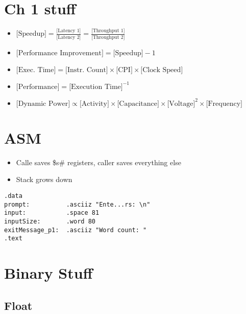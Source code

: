 \documentclass[letterpaper,landscape]{article}
\begin{document}
\begin{multicols}{2}


\section{Ch 1 stuff}
\begin{itemize}
	\item $\text{[Speedup]} = \frac{\text{[Latency 1]}}{\text{[Latency 2]}} = \frac{\text{[Throughput 1]}}{\text{[Throughput 2]}}$
	\item $\text{[Performance Improvement]} = \text{[Speedup]} - 1$
	\item $\text{[Exec. Time]} = \text{[Instr. Count]} \times \text{[CPI]} \times \text{[Clock Speed]}$
	\item $\text{[Performance]} = \text{[Execution Time]}^{-1}$
	\item $\text{[Dynamic Power]} \propto \text{[Activity]} \times \text{[Capacitance]} \times \text{[Voltage]}^2 \times \text{[Frequency]}$
\end{itemize}


\section{ASM}
\begin{itemize}
	\item Calle saves \$s\# registers, caller saves everything else
	\item Stack grows down
\end{itemize}
\begin{verbatim}
.data
prompt:          .asciiz "Ente...rs: \n"
input:           .space 81
inputSize:       .word 80
exitMessage_p1:  .asciiz "Word count: "
.text
\end{verbatim}


\section{Binary Stuff}
\subsection*{Float}


\end{multicols}
\end{document}
